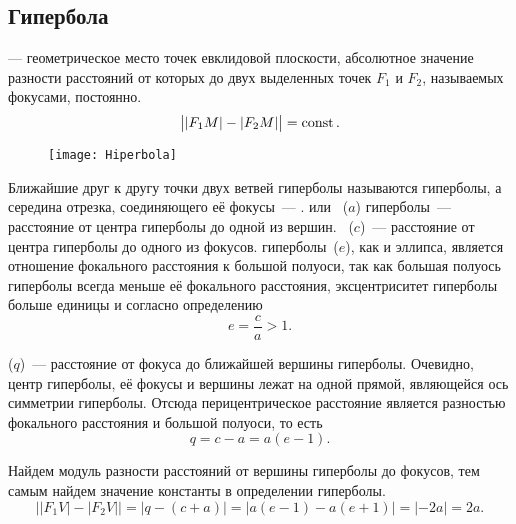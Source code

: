 \subsection{Гипербола}

{\bfseries {}} --- геометрическое место точек евклидовой плоскости, абсолютное значение разности расстояний от которых до двух выделенных точек $F_1$ и $F_2$, называемых фокусами, постоянно.
\begin{equation}
	\big||F_1M|-|F_2M|\big| = \operatorname{const}.
\end{equation}

\begin{wrapfigure}[14]{r}{0.5\tw}
	\vspace{-1pc}
	\texttt{[image: Hiperbola]}
\end{wrapfigure}
Ближайшие друг к другу точки двух ветвей гиперболы называются  гиперболы, а середина отрезка, соединяющего её фокусы~--- .  или ~($a$) гиперболы~--- расстояние от центра гиперболы до одной из вершин. ~($c$)~---  расстояние от центра гиперболы до одного из фокусов.  гиперболы~($e$), как и  эллипса, является отношение фокального расстояния к большой полуоси, так как большая полуось гиперболы всегда меньше её фокального расстояния, эксцентриситет гиперболы больше единицы и согласно определению
\begin{equation}
	e=\frac{c}{a} > 1.
\end{equation}

 ($q$)~--- расстояние от фокуса до ближайшей вершины гиперболы. Очевидно, центр гиперболы, её фокусы и вершины лежат на одной прямой, являющейся ось симметрии гиперболы. Отсюда перицентрическое расстояние является разностью фокального расстояния и большой полуоси, то есть
\begin{equation}
	q = c - a = a (e - 1).
\end{equation}

Найдем модуль разности расстояний от вершины гиперболы до фокусов, тем самым найдем значение константы в определении гиперболы. 
\begin{equation*}
	\big||F_1 V| - |F_2 V|\big| = |q - (c + a)| = |a(e - 1) - a(e + 1)| = |-2a| = 2a.
\end{equation*}

